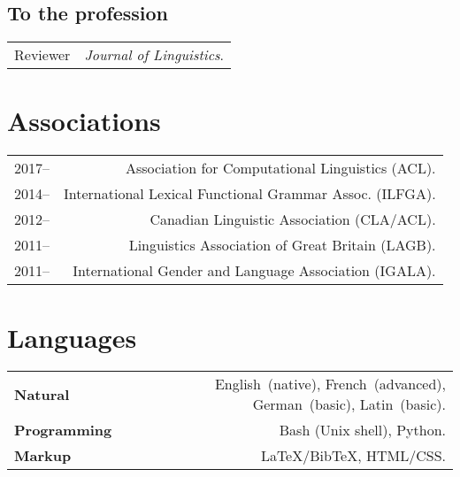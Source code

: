 \documentclass[11pt,a4paper,twoside]{article}
\makeatletter
\newenvironment{cvsection}{%
  \setlength{\extrarowheight}{0.70ex}
  \begin{longtable}[l]{@{} L R @{}}
}{%
  \end{longtable}
}
\makeatother
\begin{document}
\subsection*{To the profession}

\begin{cvsection}
Reviewer	&	\textit{Journal of Linguistics}.
\end{cvsection}
\newpage
\section*{Associations}

\begin{cvsection}
  2017--	& Association for Computational Linguistics (ACL).\\
  2014--  & International Lexical Functional Grammar Assoc. (ILFGA).\\
  2012-- 	& Canadian Linguistic Association (CLA\slash ACL).\\
  2011-- 	& Linguistics Association of Great Britain (LAGB).\\
  2011-- 	& International Gender and Language Association (IGALA).\\
\end{cvsection}

\section*{Languages}

\begin{cvsection}
  \textbf{Natural}      & English~(native), French~(advanced), German~(basic), Latin~(basic). \\
  \textbf{Programming}  & Bash (Unix shell), Python. \\
  \textbf{Markup}       & \LaTeX\slash Bib\TeX, HTML\slash CSS.
\end{cvsection}
\end{document}
